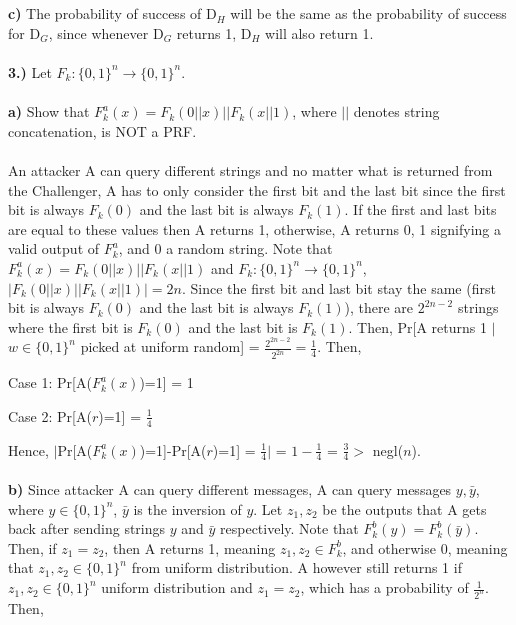 \documentclass[12pt]{article}
\begin{document}
\\
\\
\noindent \textbf{c)} The probability of success of D$_H$ will be the same as the probability of success for D$_G$, since whenever D$_G$ returns 1, D$_H$ will also return 1.
\\
\\
\noindent \textbf{3.)} Let $F_k:\{0,1\}^n \rightarrow \{0,1\}^n$.
\\
\\
\noindent \textbf{a)}  Show that $F_{k}^{a}(x) = F_k(0||x)||F_k(x||1)$, where $||$ denotes string concatenation, is NOT a PRF.
\\
\\
\noindent An attacker A can query different strings and no matter what is returned from the Challenger, A has to only consider the first bit and the last bit since the first bit is always $ F_k(0)$ and the last bit is always $F_k(1)$. If the first and last bits are equal to these values then A returns 1, otherwise, A returns 0, 1 signifying a valid output of $F_{k}^{a}$, and 0 a random string. Note that $F_{k}^{a}(x) = F_k(0||x)||F_k(x||1)$ and $F_k:\{0,1\}^n \rightarrow \{0,1\}^n$, $|F_k(0||x)||F_k(x||1)| = 2n$. Since the first bit and last bit stay the same (first bit is always $ F_k(0)$ and the last bit is always $F_k(1)$), there are $2^{2n-2}$ strings where the first bit is $ F_k(0)$ and the last bit is $F_k(1)$. Then, Pr[A returns 1 $|$ $w \in \{0,1\}^n$ picked at uniform random] = $\frac{2^{2n-2}}{2^{2n}} = \frac{1}{4}$. Then, 

Case 1: Pr[A($F_{k}^{a}(x)$)=1] = 1

Case 2: Pr[A($r$)=1] = $\frac{1}{4}$

\noindent Hence, $|$Pr[A($F_{k}^{a}(x)$)=1]-Pr[A($r$)=1] = $\frac{1}{4}|$ = $1-\frac{1}{4}$ = $\frac{3}{4}>$ negl($n$).
\\
\\
\noindent \textbf{b)} Since attacker A can query different messages, A can query messages $y, \bar{y}$, where $y \in \{0,1\}^n$, $\bar{y}$ is the inversion of $y$. Let $z_1, z_2$ be the outputs that A gets back after sending strings $y$ and $\bar{y}$ respectively. Note that $F_{k}^{b}(y) = F_{k}^{b}(\bar{y})$. Then, if $z_1 = z_2$, then A returns 1, meaning $z_1 , z_2 \in F_{k}^{b}$, and otherwise 0, meaning that $z_1 , z_2 \in \{0,1\}^n$ from uniform distribution. A however still returns 1 if $z_1 , z_2 \in \{0,1\}^n$ uniform distribution and $z_1 = z_2$, which has a probability of $\frac{1}{2^n}$. Then,
\end{document}
